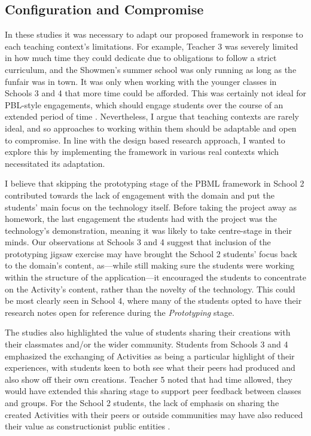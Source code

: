 \subsection{Configuration and Compromise}
In these studies it was necessary to adapt our proposed framework in response to each teaching context's limitations. For example, Teacher 3 was severely limited in how much time they could dedicate due to obligations to follow a strict curriculum, and the Showmen's summer school was only running as long as the funfair was in town. It was only when working with the younger classes in Schools 3 and 4 that more time could be afforded. This was certainly not ideal for PBL-style engagements, which should engage students over the course of an extended period of time \citep{Blumenfeld1991}. Nevertheless, I argue that teaching contexts are rarely ideal, and so approaches to working within them should be adaptable and open to compromise. In line with the design based research approach, I wanted to explore this by implementing the framework in various real contexts which necessitated its adaptation.

I believe that skipping the prototyping stage of the PBML framework in School 2 contributed towards the lack of engagement with the domain and put the students' main focus on the technology itself. Before taking the project away as homework, the last engagement the students had with the project was the technology's demonstration, meaning it was likely to take centre-stage in their minds. Our observations at Schools 3 and 4 suggest that inclusion of the prototyping jigsaw exercise may have brought the School 2 students' focus back to the domain's content, as---while still making sure the students were working within the structure of the application---it encouraged the students to concentrate on the Activity's content, rather than the novelty of the technology. This could be most clearly seen in School 4, where many of the students opted to have their research notes open for reference during the \textit{Prototyping} stage.

The studies also highlighted the value of students sharing their creations with their classmates and/or the wider community. Students from Schools 3 and 4 emphasized the exchanging of Activities as being a particular highlight of their experiences, with students keen to both see what their peers had produced and also show off their own creations. Teacher 5 noted that had time allowed, they would have extended this sharing stage to support peer feedback between classes and groups. For the School 2 students, the lack of emphasis on sharing the created Activities with their peers or outside communities may have also reduced their value as constructionist public entities \citep{PapertSeymourandHarel1991a}.

